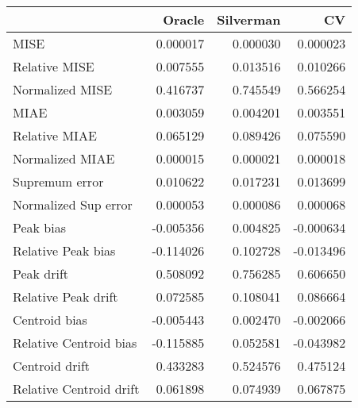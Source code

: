 \begin{tabular}{lrrr}
  \toprule
 & Oracle & Silverman & CV \\ 
  \midrule
MISE & 0.000017 & 0.000030 & 0.000023 \\ 
  Relative MISE & 0.007555 & 0.013516 & 0.010266 \\ 
  Normalized MISE & 0.416737 & 0.745549 & 0.566254 \\ 
  MIAE & 0.003059 & 0.004201 & 0.003551 \\ 
  Relative MIAE & 0.065129 & 0.089426 & 0.075590 \\ 
  Normalized MIAE & 0.000015 & 0.000021 & 0.000018 \\ 
  Supremum error & 0.010622 & 0.017231 & 0.013699 \\ 
  Normalized Sup error & 0.000053 & 0.000086 & 0.000068 \\ 
  Peak bias & -0.005356 & 0.004825 & -0.000634 \\ 
  Relative Peak bias & -0.114026 & 0.102728 & -0.013496 \\ 
  Peak drift & 0.508092 & 0.756285 & 0.606650 \\ 
  Relative Peak drift & 0.072585 & 0.108041 & 0.086664 \\ 
  Centroid bias & -0.005443 & 0.002470 & -0.002066 \\ 
  Relative Centroid bias & -0.115885 & 0.052581 & -0.043982 \\ 
  Centroid drift & 0.433283 & 0.524576 & 0.475124 \\ 
  Relative Centroid drift & 0.061898 & 0.074939 & 0.067875 \\ 
   \bottomrule
\end{tabular}
